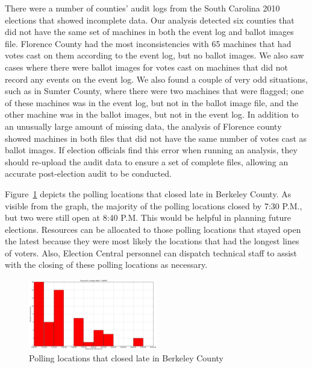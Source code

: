 There were a number of counties' audit logs from the South Carolina
2010 elections that showed incomplete data.  Our analysis detected six
counties that did not have the same set of machines in both the event
log and ballot images file.  Florence County had the most
inconsistencies with 65 machines that had votes cast on them according
to the event log, but no ballot images.  We also saw cases where there
were ballot images for votes cast on machines that did not record any
events on the event log.  We also found a couple of very odd
situations, such as in Sumter County, where there were two machines
that were flagged; one of these machines was in the event log, but not
in the ballot image file, and the other machine was in the ballot
images, but not in the event log.  In addition to an unusually large
amount of missing data, the analysis of Florence county showed
machines in both files that did not have the same number of votes cast
as ballot images.  If election officials find this error when running
an analysis,  they should re-upload the audit data to ensure a set of
complete files, allowing an accurate post-election audit to be conducted.


Figure~\ref{fig:late} depicts the polling locations that closed late in Berkeley County.  As visible from the graph, the majority of the polling locations closed by 7:30 P.M., but two were still open at 8:40 P.M.  This would be helpful in planning future elections.  Resources can be allocated to those polling locations that stayed open the latest because they were most likely the locations that had the longest lines of voters.  Also, Election Central personnel can dispatch technical staff to assist with the closing of these polling locations as necessary.   

\begin{figure}[h!]
  \caption{Polling locations that closed late in Berkeley County}
  \label{fig:late}
  \centering
    \includegraphics[width=0.5\textwidth]{berkeley}
\end{figure}

